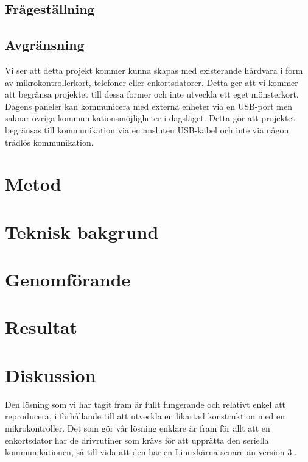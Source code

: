 \documentclass{article}
\begin{document}
		\subsection{Frågeställning} %
		\label{sub:fragestallning}
		

		\subsection{Avgränsning} %
		\label{sub:avgransning}
			Vi ser att detta projekt kommer kunna skapas med existerande hårdvara i form av mikrokontrollerkort, telefoner eller enkortsdatorer. Detta ger att vi kommer att begränsa projektet till dessa former och inte utveckla ett eget mönsterkort.\\

			\noindent Dagens paneler kan kommunicera med externa enheter via en USB-port men saknar övriga kommunikationsmöjligheter i dagsläget. Detta gör att projektet begränsas till kommunikation via en ansluten USB-kabel och inte via någon trådlös kommunikation.

	\section{Metod} %
	\label{sec:huvudtext}

	\section{Teknisk bakgrund} %
	\label{sec:teknisk_bakgrund}
	

	\section{Genomförande} %
	\label{sec:genomf_rande}
	

	\section{Resultat} %
	\label{sec:resultat}


	\section{Diskussion} %
	\label{sec:sammanfattning}
		Den lösning som vi har tagit fram är fullt fungerande och relativt enkel att reproducera, i förhållande till att utveckla en likartad konstruktion med en mikrokontroller. Det som gör vår lösning enklare är fram för allt att en enkortsdator har de drivrutiner som krävs för att upprätta den seriella kommunikationen, så till vida att den har en Linuxkärna senare än version 3 \citep{silicon}. \\
\end{document}
